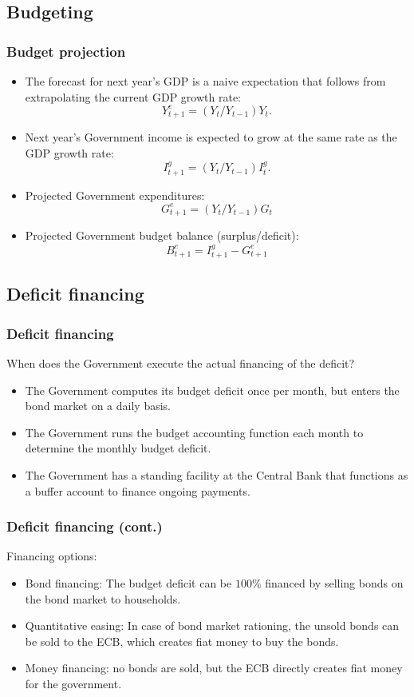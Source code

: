 \documentclass{beamer}
\begin{document}
\subsection{Budgeting}
\begin{frame}{}
\frametitle{Budget projection}
\small
\begin{itemize}
\item The forecast for next year's GDP is a naive expectation that follows from extrapolating the current GDP growth rate:
\begin{equation}
Y^e_{t+1} = (Y_t/Y_{t-1}) Y_t.
\end{equation}
\item Next year's Government income is expected to grow at the same rate as the GDP growth rate:
\begin{equation}
I^g_{t+1} = (Y_t/Y_{t-1})I^g_{t}.
\end{equation}
\item Projected Government expenditures:
    \begin{equation}
        G^e_{t+1} = (Y_t/Y_{t-1})G_t
    \end{equation}
    \item Projected Government budget balance (surplus/deficit):
    \begin{equation}
        B^e_{t+1} = I^g_{t+1} - G^e_{t+1}
    \end{equation}
\end{itemize}
\end{frame}

\subsection{Deficit financing}
\begin{frame}{}
\frametitle{Deficit financing}
When does the Government execute the actual financing of the deficit?
\begin{itemize}
\item The Government computes its budget deficit once per month, but enters the bond market on a daily basis.
\item The Government runs the budget accounting function each month to determine the monthly budget deficit.
\item The Government has a standing facility at the Central Bank that functions as a buffer account to finance ongoing payments.
\end{itemize}
\end{frame}

\begin{frame}{}
\frametitle{Deficit financing (cont.)}
Financing options:
\begin{itemize}
\item Bond financing: The budget deficit can be $100\%$ financed by selling bonds on the bond market to households.
\item Quantitative easing: In case of bond market rationing, the unsold bonds can be sold to the ECB, which creates fiat money to buy the bonds.
\item Money financing: no bonds are sold, but the ECB directly creates fiat money for the government.
\end{itemize}
\end{frame}
\end{document}
